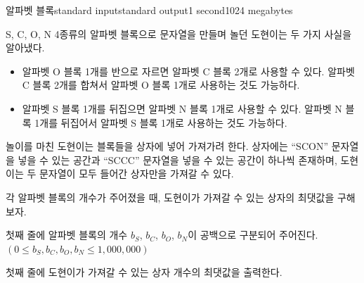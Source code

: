 \begin{problem}{알파벳 블록}{standard input}{standard output}{1 second}{1024 megabytes}

S, C, O, N 4종류의 알파벳 블록으로 문자열을 만들며 놀던 도현이는 두 가지 사실을 알아냈다.

\begin{itemize}
    \item 알파벳 O 블록 1개를 반으로 자르면 알파벳 C 블록 2개로 사용할 수 있다. 알파벳 C 블록 2개를 합쳐서 알파벳 O 블록 1개로 사용하는 것도 가능하다.
    \item 알파벳 S 블록 1개를 뒤집으면 알파벳 N 블록 1개로 사용할 수 있다. 알파벳 N 블록 1개를 뒤집어서 알파벳 S 블록 1개로 사용하는 것도 가능하다.
\end{itemize}

놀이를 마친 도현이는 블록들을 상자에 넣어 가져가려 한다. 상자에는 ``SCON'' 문자열을 넣을 수 있는 공간과 ``SCCC'' 문자열을 넣을 수 있는 공간이 하나씩 존재하며, 도현이는 두 문자열이 모두 들어간 상자만을 가져갈 수 있다.

각 알파벳 블록의 개수가 주어졌을 때, 도현이가 가져갈 수 있는 상자의 최댓값을 구해보자.


\InputFile
첫째 줄에 알파벳 블록의 개수 $b_S$, $b_C$, $b_O$, $b_N$이 공백으로 구분되어 주어진다.
$(0 ≤ b_S, b_C, b_O, b_N ≤ 1,000,000)$

\OutputFile
첫째 줄에 도현이가 가져갈 수 있는 상자 개수의 최댓값을 출력한다.

\Examples

\begin{example}
%
%
%
\end{example}

\end{problem}

